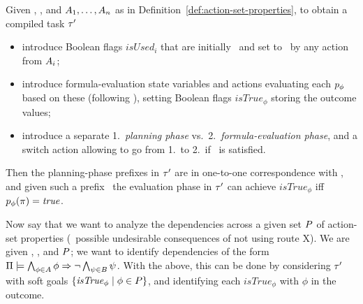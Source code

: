 Given \task, \plans, and $A_1, \dots, A_n$ as in
Definition~\ref{def:action-set-properties}, to obtain a compiled task
$\tau'$\vspace{-0.05cm}
\begin{itemize}
\item introduce Boolean flags $\mathit{isUsed}_i$ that are initially
  \false\ and set to \true\ by any action from
  $A_i$;\vspace{-0.05cm}
\item introduce formula-evaluation state variables and actions
  evaluating each $p_\phi$ based on these (following
  \cite{gazen:knoblock:ecp-97,nebel:jair-00}), setting Boolean flags
  $\mathit{isTrue}_\phi$ storing the outcome values;\vspace{-0.05cm}
\item introduce a separate 1.\ \emph{planning phase}
  vs.\ 2.\ \emph{formula-evaluation phase}, and a switch action
  allowing to go from 1.\ to 2.\ if \goalhard\ is
  satisfied.\vspace{-0.05cm}
%
%
\end{itemize}
Then the planning-phase prefixes in $\tau'$ are in one-to-one
correspondence with \plans, and given such a prefix \plan\ the
evaluation phase in $\tau'$ can achieve $\mathit{isTrue}_\phi$ iff
$p_\phi(\pi) = \mathit{true}$.

Now say that we want to analyze the dependencies across a given set
$P$ of action-set properties (\eg\ possible undesirable
consequences of not using route X). We are given \task, \plans, and
$P$; we want to identify dependencies of the form
$\Pi \models \bigwedge_{\phi \in A} \phi \Rightarrow \neg \bigwedge_{\psi
    \in B} \psi$. With the above, this can be done by considering
$\tau'$ with soft goals $\{\mathit{isTrue}_\phi \mid \phi \in
P\}$, and identifying each $\mathit{isTrue}_\phi$ with $\phi$ in
the outcome.

